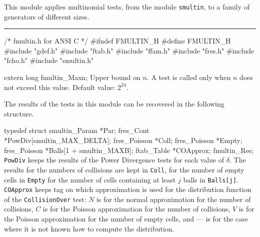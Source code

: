 
This module applies multinomial tests, from the module {\tt smultin},
to a family of generators of different sizes.

\iffalse  %
There are different functions to choose the different parameters for the
 tests. The dimension $t$ and the interval length $d$ are mutually exclusive:
 we fix one of them and the other will be chosen by the program.
 Usually, we fix the dimension $t$,
and the interval $d$ will be chosen by one of the function {\tt Choose\_d}.
We may also fix the interval $d$, and then one of the function
 {\tt Choose\_t} will select a value of $t$.
\fi  %


\bigskip
\hrule
\code\hide
/* fmultin.h for ANSI C */
#ifndef FMULTIN_H
#define FMULTIN_H
\endhide
#include "gdef.h"
#include "ftab.h"
#include "ffam.h"
#include "fres.h"
#include "fcho.h"
#include "smultin.h"


extern long fmultin_Maxn;
\endcode
\tab
  Upper bound on $n$.
  A test is called only when $n$ does not exceed this value.
  Default value: $2^{24}$.
\endtab

\ifdetailed %


The results of the tests in this module can be recovered
in the following structure.

\code

typedef struct {
   smultin_Param *Par;
   fres_Cont *PowDiv[smultin_MAX_DELTA];
   fres_Poisson *Coll;
   fres_Poisson *Empty;
   fres_Poisson *Balls[1 + smultin_MAXB];
   ftab_Table *COApprox;
} fmultin_Res;
\endcode
\tab
  {\tt PowDiv} keeps the results of the Power Divergence tests for each
  value of $\delta$. The results for the numbers of collisions are kept in
  {\tt Coll}, for the number of empty cells in {\tt Empty} for the number of
  cells containing at least $j$ balls in  {\tt Balls[j]}.
  {\tt COApprox} keeps tag on which approximation is used for the
  distribution function of the {\tt CollisionOver} test:
  $N$ is for the normal approximation for the number of collisions,
  $C$ is for the Poisson approximation for the number of collisions,
  $V$ is for the Poisson approximation for the number of empty cells, and
  --- is for the case where it is not known how to compute the distribution.
\endtab
\code


